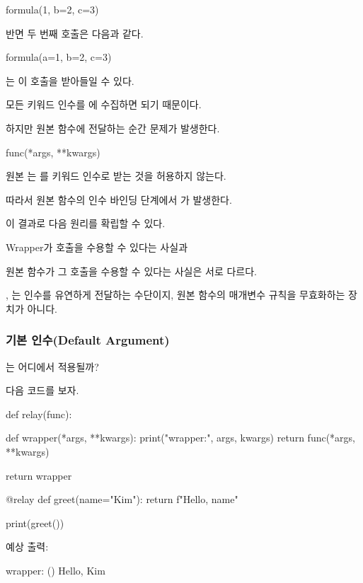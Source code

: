 \begin{dhkcode}
formula(1, b=2, c=3)
\end{dhkcode}

반면 두 번째 호출은 다음과 같다.

\begin{dhkcode}
formula(a=1, b=2, c=3)
\end{dhkcode}

는 이 호출을 받아들일 수 있다.

모든 키워드 인수를 에 수집하면 되기 때문이다.

하지만 원본 함수에 전달하는 순간 문제가 발생한다.

\begin{dhkcode}
func(*args, **kwargs)
\end{dhkcode}

원본 는 를 키워드 인수로 받는 것을 허용하지 않는다.

따라서 원본 함수의 인수 바인딩 단계에서 가 발생한다.

이 결과로 다음 원리를 확립할 수 있다.

\begin{dhksmry}[centered]
Wrapper가 호출을 수용할 수 있다는 사실과

원본 함수가 그 호출을 수용할 수 있다는 사실은 서로 다르다.
\end{dhksmry}

, 는 인수를 유연하게 전달하는 수단이지, 원본 함수의 매개변수 규칙을 무효화하는 장치가 아니다.

\subsubsection{기본 인수(Default Argument)}는 어디에서 적용될까?

다음 코드를 보자.

\begin{dhkcode}
def relay(func):

    def wrapper(*args, **kwargs):
        print("wrapper:", args, kwargs)
        return func(*args, **kwargs)

    return wrapper


@relay
def greet(name="Kim"):
    return f"Hello, {name}"


print(greet())
\end{dhkcode}

예상 출력:

\begin{dhkzsh}
wrapper: () {}
Hello, Kim
\end{dhkzsh}

